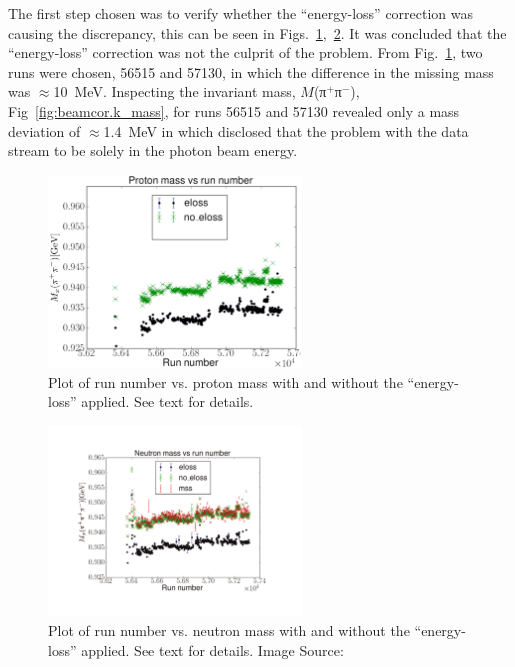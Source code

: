 The first step chosen was to verify whether the ``energy-loss'' correction was causing the discrepancy, this can be seen in Figs.~\ref{fig:beamcor.p_mass},~\ref{fig:beamcor.n_mass}. It was concluded that the ``energy-loss'' correction was not the culprit of the problem. From Fig.~\ref{fig:beamcor.p_mass}, two runs were chosen, 56515 and 57130, in which the difference in the missing mass was $\approx$10~MeV. Inspecting the invariant mass, $M$(π$^+$π$^-$), Fig~\ref{fig:beamcor.k_mass}, for runs 56515 and 57130 revealed only a mass deviation of $\approx$1.4~MeV in which disclosed that the problem with the  data stream to be solely in the photon beam energy.


\begin{figure}\begin{center}
\includegraphics[width=0.6\textwidth]{figures/calib/tag/ecor/P_mass_issue.eps}
\caption[Run Number vs. Proton Mass ]{\label{fig:beamcor.p_mass}Plot of  run number vs. proton mass with and without the ``energy-loss'' applied. See text for details.}
\end{center}\end{figure}

\begin{figure}\begin{center}
\includegraphics[width=0.6\textwidth]{figures/calib/tag/ecor/N_mass_issue.pdf}
\caption[Run Number vs. Neutron Mass]{\label{fig:beamcor.n_mass}Plot of  run number vs. neutron mass with and without the ``energy-loss'' applied. See text for details. Image Source:~\cite{clas.thesis.bookwalter}}
\end{center}\end{figure}

